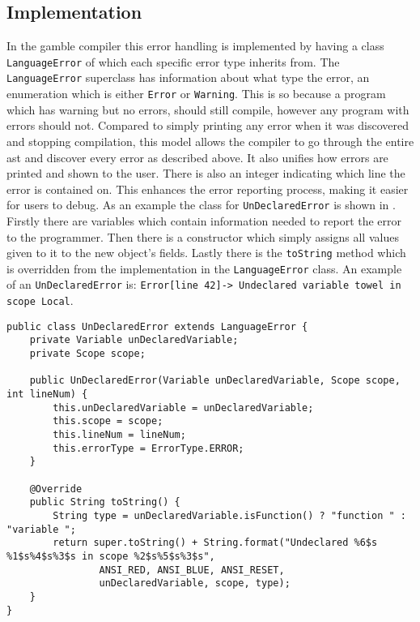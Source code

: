 \subsection*{Implementation}\label{subsec:ImplementationErrorHandling}
In the \gls{gamble} compiler this error handling is implemented by having a class \texttt{LanguageError} of which each specific error type inherits from.
The \texttt{LanguageError} superclass has information about what type the error, an enumeration which is either \texttt{Error} or \texttt{Warning}. 
This is so because a program which has warning but no errors, should still compile, however any program with errors should not. 
Compared to simply printing any error when it was discovered and stopping compilation, this model allows the compiler to go through the entire \acrshort{ast} and discover every error as described above. 
It also unifies how errors are printed and shown to the user.
There is also an integer indicating which line the error is contained on.
This enhances the error reporting process, making it easier for users to debug. 
As an example the class for \texttt{UnDeclaredError} is shown in .
Firstly there are variables which contain information needed to report the error to the programmer. 
Then there is a constructor which simply assigns all values given to it to the new object's fields.
Lastly there is the \texttt{toString} method which is overridden from the implementation in the \texttt{LanguageError} class. 
An example of an \texttt{UnDeclaredError} is: \texttt{Error[line   42]-> Undeclared variable towel in scope Local}. %

\begin{lstlisting}[caption=The UnDeclaredError class in the \gls{gamble} compiler,numbers=none,frame=tlrb,label={lst:undeclarederrorclass}]
public class UnDeclaredError extends LanguageError {
    private Variable unDeclaredVariable;
    private Scope scope;

    public UnDeclaredError(Variable unDeclaredVariable, Scope scope, int lineNum) {
        this.unDeclaredVariable = unDeclaredVariable;
        this.scope = scope;
        this.lineNum = lineNum;
        this.errorType = ErrorType.ERROR;
    }

    @Override
    public String toString() {
        String type = unDeclaredVariable.isFunction() ? "function " : "variable ";
        return super.toString() + String.format("Undeclared %6$s %1$s%4$s%3$s in scope %2$s%5$s%3$s",
                ANSI_RED, ANSI_BLUE, ANSI_RESET,
                unDeclaredVariable, scope, type);
    }
}
\end{lstlisting}

